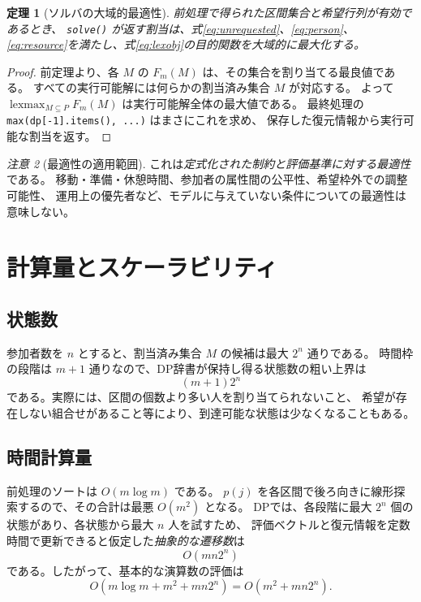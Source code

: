 \documentclass[11pt,a4paper]{ltjsarticle}
\newtheorem{theorem}{定理}[section]
\theoremstyle{definition}
\theoremstyle{remark}
\newtheorem{remark}[theorem]{注意}
\newcommand{\lexmax}{\operatorname{lexmax}}
\newcommand{\code}[1]{\texttt{#1}}
\begin{document}
\begin{theorem}[ソルバの大域的最適性]
前処理で得られた区間集合と希望行列が有効であるとき、
\code{solve()} が返す割当は、式\eqref{eq:unrequested}、\eqref{eq:person}、
\eqref{eq:resource}を満たし、式\eqref{eq:lexobj}の目的関数を大域的に最大化する。
\end{theorem}
\begin{proof}
前定理より、各 $M$ の $F_m(M)$ は、その集合を割り当てる最良値である。
すべての実行可能解には何らかの割当済み集合 $M$ が対応する。
よって $\lexmax_{M\subseteq P}F_m(M)$ は実行可能解全体の最大値である。
最終処理の \code{max(dp[-1].items(), ...)} はまさにこれを求め、
保存した復元情報から実行可能な割当を返す。
\end{proof}

\begin{remark}[最適性の適用範囲]
これは\emph{定式化された制約と評価基準に対する最適性}である。
移動・準備・休憩時間、参加者の属性間の公平性、希望枠外での調整可能性、
運用上の優先者など、モデルに与えていない条件についての最適性は意味しない。
\end{remark}

\section{計算量とスケーラビリティ}
\subsection{状態数}
参加者数を $n$ とすると、割当済み集合 $M$ の候補は最大 $2^n$ 通りである。
時間枠の段階は $m+1$ 通りなので、DP辞書が保持し得る状態数の粗い上界は
\[
 (m+1)2^n
\]
である。実際には、区間の個数より多い人を割り当てられないこと、
希望が存在しない組合せがあること等により、到達可能な状態は少なくなることもある。

\subsection{時間計算量}
前処理のソートは $O(m\log m)$ である。
$p(j)$ を各区間で後ろ向きに線形探索するので、その合計は最悪 $O(m^2)$ となる。
DPでは、各段階に最大 $2^n$ 個の状態があり、各状態から最大 $n$ 人を試すため、
評価ベクトルと復元情報を定数時間で更新できると仮定した\emph{抽象的な遷移数}は
\[
 O(mn2^n)
\]
である。したがって、基本的な演算数の評価は
\begin{equation}
 O(m\log m+m^2+mn2^n)=O(m^2+mn2^n).
 \label{eq:abstractcomplex}
\end{equation}
\end{document}
